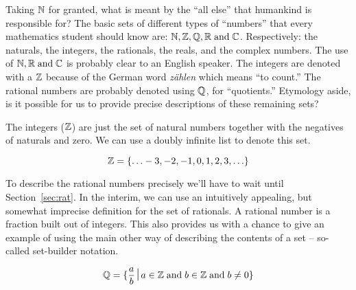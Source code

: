 Taking ${\mathbb N}$ for granted, what is meant by the ``all else''
that humankind is responsible for?  The basic sets of different types
of ``numbers'' that every mathematics student should know are: ${\mathbb N},
{\mathbb Z}, {\mathbb Q}, {\mathbb R}
\; \mbox{and} \; {\mathbb C}$.  Respectively: the naturals, the integers, the
rationals, the reals, and the complex numbers.  The use of ${\mathbb N},
{\mathbb R} \; \mbox{and} \; {\mathbb C}$ is probably clear to an English
speaker.  The integers are denoted with a ${\mathbb Z}$ because of the
German word {\em z\"{a}hlen} which means ``to count.''   The rational numbers are
probably denoted using ${\mathbb Q}$, for ``quotients.''  Etymology
aside, is it possible for us to provide precise descriptions of these
remaining sets?  

The  integers (${\mathbb Z}$) are just the set of natural numbers
together with the negatives of naturals and zero.  We can use
a doubly infinite list to denote this set.

\[ {\mathbb Z} = \{ \ldots -3, -2, -1, 0, 1, 2, 3, \ldots \} \]


To describe the  rational numbers precisely we'll have to wait until Section~\ref{sec:rat}.
In the interim, we can use an intuitively appealing, but somewhat imprecise
definition for the set of rationals.  A rational number is a fraction built out
of integers.   This also provides us with
a chance to give an example of using the main other way of describing
the contents of a set -- so-called  set-builder notation.

\[ \Rationals = \{ \frac{a}{b} \suchthat a \in \Integers \; \mbox{and} \;
b \in \Integers \; \mbox{and} \; b \neq 0 \} \]

